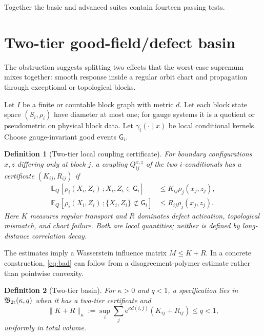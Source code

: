 \documentclass[11pt]{article}
\newcommand{\e}{\mathrm e}
\newtheorem{definition}{Definition}[section]
\theoremstyle{remark}
\begin{document}
Together the basic and advanced suites contain fourteen passing tests.

\section{Two-tier good-field/defect basin}

The obstruction suggests splitting two effects that the worst-case supremum
mixes together: smooth response inside a regular orbit chart and propagation
through exceptional or topological blocks.

Let $I$ be a finite or countable block graph with metric $d$.  Let each block
state space $(S_i,\rho_i)$ have diameter at most one; for gauge systems it is a
quotient or pseudometric on physical block data.  Let $\gamma_i(\cdot\mid x)$
be local conditional kernels.  Choose gauge-invariant good events
$\mathsf G_i$.

\begin{definition}[Two-tier local coupling certificate]
For boundary configurations $x,z$ differing only at block $j$, a coupling
$Q_{ij}^{x,z}$ of the two $i$-conditionals has a certificate $(K_{ij},R_{ij})$
if
\begin{align}
 \mathbb E_Q[\rho_i(X_i,Z_i)\,;
       X_i,Z_i\in\mathsf G_i]
 &\le K_{ij}\rho_j(x_j,z_j),\label{eq:good}\\
 \mathbb E_Q[\rho_i(X_i,Z_i)\,;
       \{X_i,Z_i\}\not\subset\mathsf G_i]
 &\le R_{ij}\rho_j(x_j,z_j).
 \label{eq:bad}
\end{align}
Here $K$ measures regular transport and $R$ dominates defect activation,
topological mismatch, and chart failure.  Both are local quantities; neither is
defined by long-distance correlation decay.
\end{definition}

The estimates imply a Wasserstein influence matrix $M\le K+R$.  In a concrete
construction, \eqref{eq:bad} can follow from a disagreement-polymer estimate
rather than pointwise convexity.

\begin{definition}[Two-tier basin]
For $\kappa>0$ and $q<1$, a specification lies in
$\mathfrak B_{\rm 2t}(\kappa,q)$ when it has a two-tier certificate and
\begin{equation}\label{eq:twotier}
 \|K+R\|_\kappa
 :=\sup_i\sum_j\e^{\kappa d(i,j)}(K_{ij}+R_{ij})\le q<1,
\end{equation}
uniformly in total volume.
\end{definition}
\end{document}
